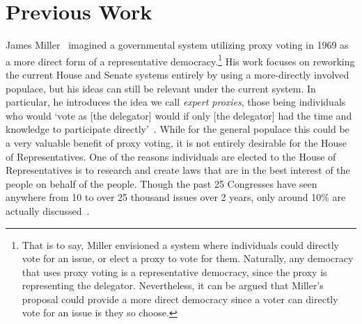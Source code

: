 \section{Previous Work}\label{sec:previous-work}
James Miller~\cite{Miller1969} imagined a governmental system utilizing proxy voting
in 1969 as a more direct form of a representative democracy.\footnote{
    That is to say, Miller envisioned a system where individuals could directly vote
    for an issue, or elect a proxy to vote for them.
    Naturally, any democracy that uses proxy voting is a representative democracy,
    since the proxy is representing the delegator.
    Nevertheless, it can be argued that Miller's proposal could provide a more direct
    democracy since a voter can directly vote for an issue is they so choose.
}
His work focuses on reworking the current House and Senate systems entirely by using a
more-directly involved populace, but his ideas can still be relevant under the current
system.
In particular, he introduces the idea we call \textit{expert proxies},
those being individuals who would `vote as [the delegator] would if only
[the delegator] had the time and knowledge to participate directly'~\cite{Miller1969}.
While for the general populace this could be a very valuable benefit of proxy voting,
it is not entirely desirable for the House of Representatives.
One of the reasons individuals are elected to the House of Representatives is to
research and create laws that are in the best interest of the people on behalf of
the people.
Though the past 25 Congresses have seen anywhere from 10 to over 25 thousand issues
over 2 years, only around 10\% are actually discussed~\cite{GovTrack2022}.
